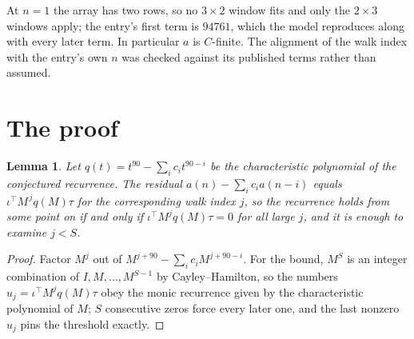 \documentclass[11pt,a4paper]{article}
\theoremstyle{plain}
\newtheorem{lemma}[theorem]{Lemma}
\theoremstyle{definition}
\begin{document}
At $n=1$ the array has two rows, so no $3\times2$ window fits and only the
$2\times3$ windows apply; the entry's first term is
$94761$, which the model reproduces along with every later term.
In particular $a$ is $C$-finite. The alignment of the walk index with the entry's own $n$ was
checked against its published terms rather than assumed.

\section{The proof}

\begin{lemma}\label{lem:crit}
Let $q(t)=t^{90}-\sum_i c_it^{90-i}$ be the characteristic polynomial of the
conjectured recurrence. The residual $a(n)-\sum_ic_ia(n-i)$ equals
$\iota^{\!\top}M^{\,j}q(M)\tau$ for the corresponding walk index $j$, so the recurrence
holds from some point on if and only if $\iota^{\!\top}M^{j}q(M)\tau=0$ for all large $j$,
and it is enough to examine $j<S$.
\end{lemma}

\begin{proof}
Factor $M^{j}$ out of $M^{j+90}-\sum_ic_iM^{j+90-i}$. For the bound, $M^{S}$
is an integer combination of $I,M,\dots,M^{S-1}$ by Cayley--Hamilton, so the numbers
$u_j=\iota^{\!\top}M^{j}q(M)\tau$ obey the monic recurrence given by the characteristic
polynomial of $M$; $S$ consecutive zeros force every later one, and the last nonzero $u_j$
pins the threshold exactly.
\end{proof}
\end{document}
